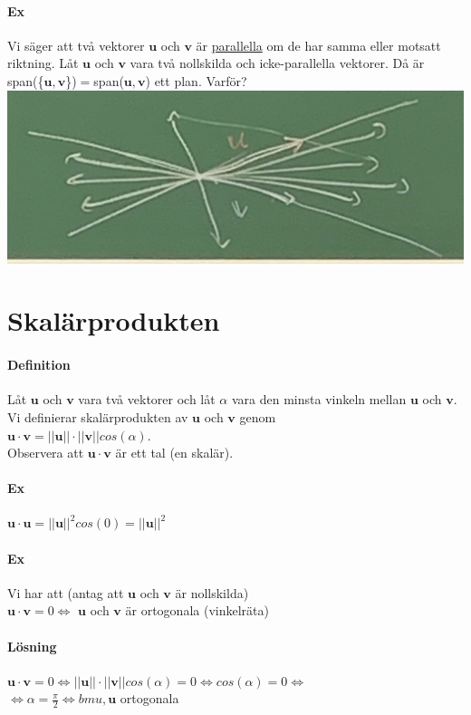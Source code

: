 \paragraph{Ex} Vi säger att två vektorer $\bm{u}$ och $\bm{v}$ är \underline{parallella} om de har samma eller motsatt riktning.
Låt $\bm{u}$ och $\bm{v}$ vara två nollskilda och icke-parallella vektorer. Då är span(\{$\bm{u,v}$\})$=$span($\bm{u},\bm{v}$) ett plan. Varför?\\
\includegraphics[scale=0.15]{imgs/22-01-20-img02.jpg}

\section{Skalärprodukten}
\paragraph{Definition} Låt $\bm{u}$ och $\bm{v}$ vara två vektorer och låt $\alpha$ vara den minsta vinkeln mellan $\bm{u}$ och $\bm{v}$.
Vi definierar skalärprodukten av $\bm{u}$ och $\bm{v}$ genom \\
$\bm{u}\cdot \bm{v}=||\bm{u}||\cdot ||\bm{v}||cos(\alpha)$.
\\Observera att $\bm{u}\cdot \bm{v}$ är ett tal (en skalär).

\paragraph{Ex} $\bm{u}\cdot \bm{u}=||\bm{u}||^{2}cos(0)=||\bm{u}||^{2}$

\paragraph{Ex} Vi har att (antag att $\bm{u}$ och $\bm{v}$ är nollskilda)\\
$\bm{u}\cdot \bm{v} = 0 \Leftrightarrow $ $\bm{u}$ och $\bm{v}$ är ortogonala (vinkelräta)

\paragraph{Lösning} $\bm{u}\cdot \bm{v}=0 \Leftrightarrow ||\bm{u}||\cdot ||\bm{v}||cos(\alpha)=0 \Leftrightarrow cos(\alpha)=0 \Leftrightarrow $\\
$\Leftrightarrow \alpha = \frac{\pi}{2} \Leftrightarrow bm{u}, \bm{u}$ ortogonala

